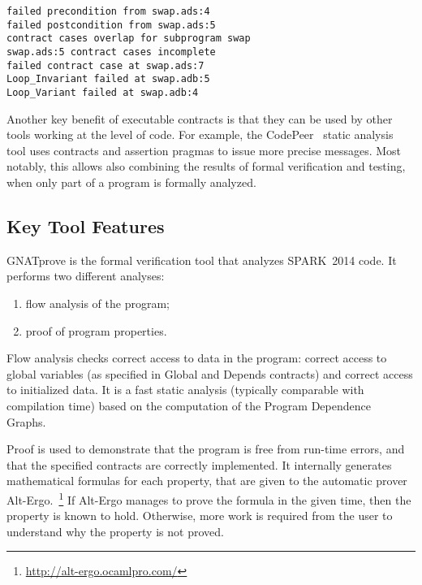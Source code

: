 \documentclass[10pt,a4paper,twocolumn]{article}
\newcommand{\gnatprove}{GNATprove\xspace}
\newcommand{\newspark}{SPARK~2014\xspace}
\newcommand{\altergo}{Alt-Ergo\xspace}
\begin{document}
\begin{footnotesize}
\begin{verbatim}
failed precondition from swap.ads:4
failed postcondition from swap.ads:5
contract cases overlap for subprogram swap
swap.ads:5 contract cases incomplete
failed contract case at swap.ads:7
Loop_Invariant failed at swap.adb:5
Loop_Variant failed at swap.adb:4
\end{verbatim}
\end{footnotesize}

Another key benefit of executable contracts is that they can be used by other
tools working at the level of code. For example, the CodePeer~\cite{codepeer}
static analysis tool uses contracts and assertion pragmas to issue more precise
messages. Most notably, this allows also combining the results of formal
verification and testing, when only part of a program is formally
analyzed.~\cite{hiliteERTS2012}

\subsection{Key Tool Features}

\gnatprove is the formal verification tool that analyzes \newspark code. It
performs two different analyses:

\begin{enumerate}
\item flow analysis of the program;
\item proof of program properties.
\end{enumerate}

Flow analysis checks correct access to data in the program: correct access to
global variables (as specified in Global and Depends contracts) and correct
access to initialized data. It is a fast static analysis (typically comparable
with compilation time) based on the computation of the Program Dependence
Graphs.~\cite{Horwitz:1988:ISU:53990.53994}

Proof is used to demonstrate that the program is free from run-time errors, and
that the specified contracts are correctly implemented. It internally generates
mathematical formulas for each property, that are given to the automatic prover
\altergo.~\footnote{\url{http://alt-ergo.ocamlpro.com/}} If \altergo manages to
prove the formula in the given time, then the property is known to
hold. Otherwise, more work is required from the user to understand why the
property is not proved.
\end{document}
